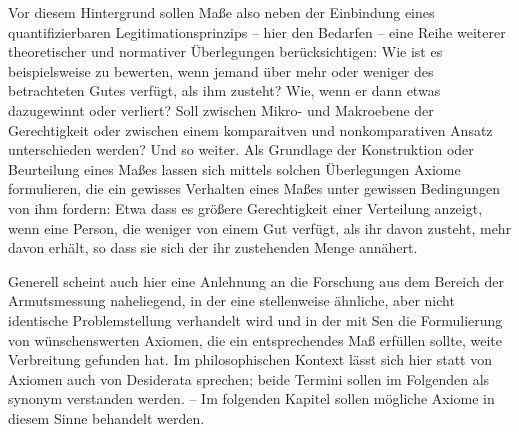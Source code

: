 \documentclass[a4paper]{thesis}
\begin{document}
Vor diesem Hintergrund sollen Maße also neben der Einbindung eines quantifizierbaren Legitimationsprinzips -- hier den Bedarfen -- eine Reihe weiterer theoretischer und normativer Überlegungen berücksichtigen: Wie ist es beispielsweise zu bewerten, wenn jemand über mehr oder weniger des betrachteten Gutes verfügt, als ihm zusteht? Wie, wenn er dann etwas dazugewinnt oder verliert? Soll zwischen Mikro- und Makroebene der Gerechtigkeit oder zwischen einem komparaitven und nonkomparativen Ansatz unterschieden werden? Und so weiter. Als Grundlage der Konstruktion oder Beurteilung eines Maßes lassen sich mittels solchen Überlegungen Axiome formulieren, die ein gewisses Verhalten eines Maßes unter gewissen Bedingungen von ihm fordern: Etwa dass es größere Gerechtigkeit einer Verteilung anzeigt, wenn eine Person, die weniger von einem Gut verfügt, als ihr davon zusteht, mehr davon erhält, so dass sie sich der ihr zustehenden Menge annähert.

Generell scheint auch hier eine Anlehnung an die Forschung aus dem Bereich der Armutsmessung naheliegend, in der eine stellenweise ähnliche, aber nicht identische Problemstellung verhandelt wird und in der mit Sen die Formulierung von wünschenswerten Axiomen, die ein entsprechendes Maß erfüllen sollte, weite Verbreitung gefunden hat. Im philosophischen Kontext lässt sich hier statt von Axiomen auch von Desiderata sprechen; beide Termini sollen im Folgenden als synonym verstanden werden. -- Im folgenden Kapitel sollen mögliche Axiome in diesem Sinne behandelt werden.
\end{document}
